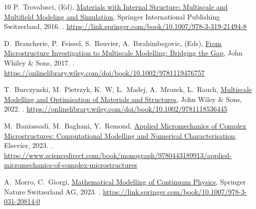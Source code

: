 \documentclass{elsarticle}
\theoremstyle{definition}
\begin{document}
\begin{thebibliography}{10}
P.~Trovalusci, (Ed),
  \href{https://link.springer.com/book/10.1007/978-3-319-21494-8}{Materials
  with Internal Structure: Multiscale and Multifield Modeling and Simulation},
  Springer International Publishing Switzerland, 2016.
\newblock \href {https://doi.org/10.1007/978-3-319-21494-8}
  {}.
\newline\urlprefix\url{https://link.springer.com/book/10.1007/978-3-319-21494-8}

D.~Brancherie, P.~Feissel, S.~Bouvier, A.~Ibrahimbegovic, (Eds),
  \href{https://onlinelibrary.wiley.com/doi/book/10.1002/9781119476757}{From
  Microstructure Investigation to Multiscale Modelling: Bridging the Gap}, John
  Whiley \& Sons, 2017.
\newblock \href {https://doi.org/10.1002/9781119476757}
  {}.
\newline\urlprefix\url{https://onlinelibrary.wiley.com/doi/book/10.1002/9781119476757}

T.~Burczynski, M.~Pietrzyk, K.~W, L.~Madej, A.~Mrozek, L.~Rauch,
  \href{https://onlinelibrary.wiley.com/doi/book/10.1002/9781118536445}{Multiscale
  Modelling and Optimisation of Materials and Structures}, John Wiley \& Sons,
  2022.
\newblock \href {https://doi.org/10.1002/9781118536445}
  {}.
\newline\urlprefix\url{https://onlinelibrary.wiley.com/doi/book/10.1002/9781118536445}

M.~Baniassadi, M.~Baghani, Y.~Remond,
  \href{https://www.sciencedirect.com/book/monograph/9780443189913/applied-micromechanics-of-complex-microstructures}{Applied
  Micromechanics of Complex Microstructures: Computational Modelling and
  Numerical Characterisation}, Elsevier, 2023.
\newblock \href {https://doi.org/10.1016/C2022-0-01129-6}
  {}.
\newline\urlprefix\url{https://www.sciencedirect.com/book/monograph/9780443189913/applied-micromechanics-of-complex-microstructures}

A.~Morro, C.~Giorgi,
  \href{https://link.springer.com/book/10.1007/978-3-031-20814-0}{Mathematical
  Modelling of Continuum Physics}, Springer Nature Switzerland AG, 2023.
\newblock \href {https://doi.org/10.1007/978-3-031-20814-0}
  {}.
\newline\urlprefix\url{https://link.springer.com/book/10.1007/978-3-031-20814-0}


\end{thebibliography}
\end{document}
